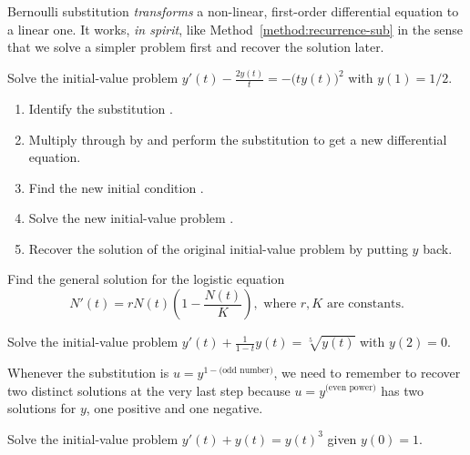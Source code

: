 \documentclass[../main.tex]{subfiles}
\begin{document}
Bernoulli substitution \emph{transforms} a non-linear, first-order differential equation to a linear one. It works, \emph{in spirit}, like Method~\ref{method:recurrence-sub} in the sense that we solve a simpler problem first and recover the solution later.
\begin{example} 
  Solve the initial-value problem \(y'(t) - \frac{2 y(t)}{t}  = -\big( ty(t) \big)^{2}\) with \(y(1) = 1/2\).

  \begin{enumerate}[wide, label=Step~(\arabic*).]
    \item Identify the substitution \underline{\hspace{2in}}.
    \item Multiply through by \underline{\hspace{1in}} and perform the substitution to get a new differential equation.
    \item Find the new initial condition \underline{\hspace{3in}}.
    \item Solve the new initial-value problem \underline{\hspace{3in}}.
    \item Recover the solution of the original initial-value problem by putting \(y\) back.
  \end{enumerate}
\end{example}
\clearpage

\begin{example}
  Find the general solution for the logistic equation
  \[
    N'(t) = rN(t) \left( 1 - \frac{N(t)}{K} \right), \text{ where \(r,K\) are constants}.
  \]
\end{example}


\begin{example}
  Solve the initial-value problem \(y'(t) + \frac{1}{1 - t} y(t)  = \sqrt[5]{y(t)}\) with \(y(2) = 0\).
\end{example}
\clearpage

Whenever the substitution is \(u = y^{1-\text{(odd number)}}\), we need to remember to recover two distinct solutions at the very last step because \(u = y^{\text{(even power)}}\) has two solutions for \(y\), one positive and one negative.
\begin{example}
  Solve the initial-value problem \(y'(t) + y(t) = y(t)^{3}\) given \(y(0) = 1\).
\end{example}
\end{document}
